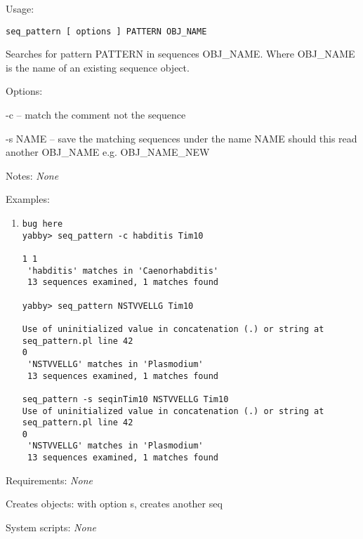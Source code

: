 \begin{description}


\item{Usage:}

{\tt seq\_pattern [ options ] PATTERN OBJ\_NAME}

Searches for pattern PATTERN in sequences OBJ\_NAME.
Where OBJ\_NAME is the name of an existing sequence object.


\item{Options:}
\begin{description}
\item -c -- match the comment not the sequence
\item -s NAME -- save the matching sequences under the name NAME 
                 should this read another OBJ\_NAME e.g. OBJ\_NAME\_NEW
\end{description}


\item{Notes:} {\em None}


\item{Examples:}
\begin{enumerate}

\item
\begin{verbatim}
bug here 
yabby> seq_pattern -c habditis Tim10

1 1
 'habditis' matches in 'Caenorhabditis'
 13 sequences examined, 1 matches found

yabby> seq_pattern NSTVVELLG Tim10

Use of uninitialized value in concatenation (.) or string at seq_pattern.pl line 42
0
 'NSTVVELLG' matches in 'Plasmodium'
 13 sequences examined, 1 matches found

seq_pattern -s seqinTim10 NSTVVELLG Tim10
Use of uninitialized value in concatenation (.) or string at seq_pattern.pl line 42
0
 'NSTVVELLG' matches in 'Plasmodium'
 13 sequences examined, 1 matches found

\end{verbatim}

\end{enumerate}


\item{Requirements:} {\em None}


\item{Creates objects:} with option s, creates another seq


\item{System scripts:} {\em None}

\end{description}

